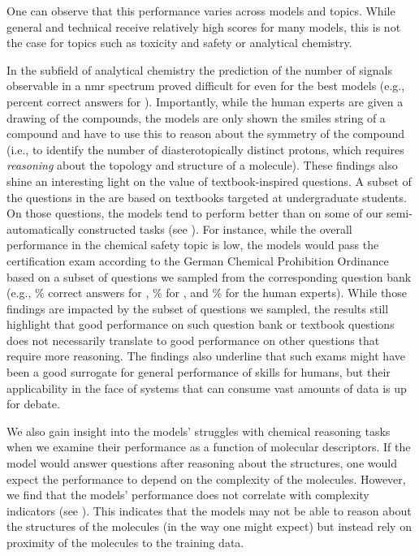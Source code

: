 \documentclass[11pt, oneside]{article}
\begin{document}
\begin{refsection}
One can observe that this performance varies across models and topics.
While general and technical receive relatively high scores for many models, this is not the case for topics such as toxicity and safety or analytical chemistry.

In the subfield of analytical chemistry the prediction of the number of signals observable in a \gls{nmr} spectrum proved difficult for even for the best models (e.g.,  percent correct answers for \oone).
Importantly, while the human experts are given a drawing of the compounds, the models are only shown the \gls{smiles} string of a compound and have to use this to reason about the symmetry of the compound (i.e., to identify the number of diasterotopically distinct protons, which requires \emph{reasoning} about the topology and structure of a molecule).
 These findings also shine an interesting light on the value of textbook-inspired questions.
 A subset of the questions in the \chembench are based on textbooks targeted at undergraduate students.
 On those questions, the models tend to perform better than on some of our semi-automatically constructed tasks (see ).
 For instance, while the overall performance in the chemical safety topic is low, the models would pass the certification exam according to the German Chemical Prohibition Ordinance based on a subset of questions we sampled from the corresponding question bank (e.g., \% correct answers for \GPTFour, \% for \ClaudeThreeFiveSonnet, and \% for the human experts).
 While those findings are impacted by the subset of questions we sampled, the results still highlight that good performance on such question bank or textbook questions does not necessarily translate to good performance on other questions that require more reasoning. The findings also underline that such exams might have been a good surrogate for general performance of skills for humans, but their applicability in the face of systems that can consume vast amounts of data is up for debate.

 We also gain insight into the models' struggles with chemical reasoning tasks when we examine their performance as a function of molecular descriptors.
 If the model would answer questions after reasoning about the structures, one would expect the performance to depend on the complexity of the molecules.
 However, we find that the models' performance does not correlate with complexity indicators (see ).
 This indicates that the models may not be able to reason about the structures of the molecules (in the way one might expect) but instead rely on proximity of the molecules to the training data.\autocite{mccoy2023embersautoregressionunderstandinglarge}


\end{refsection}
\end{document}
